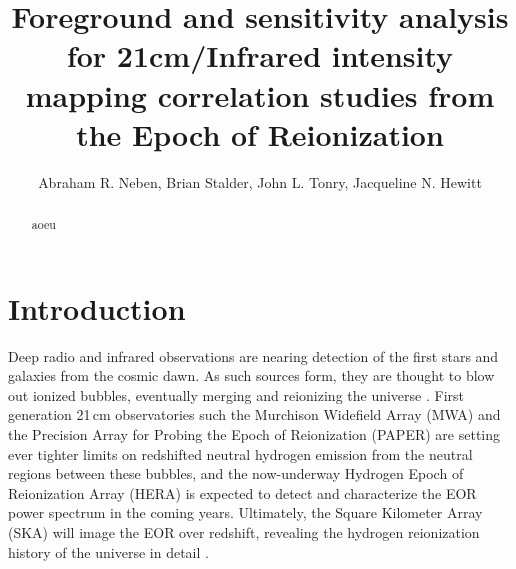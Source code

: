 \documentclass{emulateapj}
\begin{document}
\title{Foreground and sensitivity analysis for 21cm/Infrared intensity mapping correlation studies from the Epoch of Reionization}


\author{Abraham R. Neben,
Brian Stalder,
John L. Tonry,
Jacqueline N. Hewitt}




\begin{abstract}
aoeu
\end{abstract}


\section{Introduction}

Deep radio and infrared observations are nearing detection of the first stars and galaxies from the cosmic dawn. As such sources form, they are thought to blow out ionized bubbles, eventually merging and reionizing the universe \citep{FurlanettoReview,miguelreview,PritchardLoebReview}. First generation 21\,cm observatories such the Murchison Widefield Array (MWA) \citep{tingay13,mwascience} and the Precision Array for Probing the Epoch of Reionization (PAPER) \citep{parsons14,ali15,PoberPAPER64Heating,DannyMultiRedshift} are setting ever tighter limits on redshifted neutral hydrogen emission from the neutral regions between these bubbles, and the now-underway Hydrogen Epoch of Reionization Array (HERA) \citep{deboer16} is expected to detect and characterize the EOR power spectrum in the coming years. Ultimately, the Square Kilometer Array (SKA) will image the EOR over redshift, revealing the hydrogen reionization history of the universe in detail \citep{ska}. 
\end{document}
